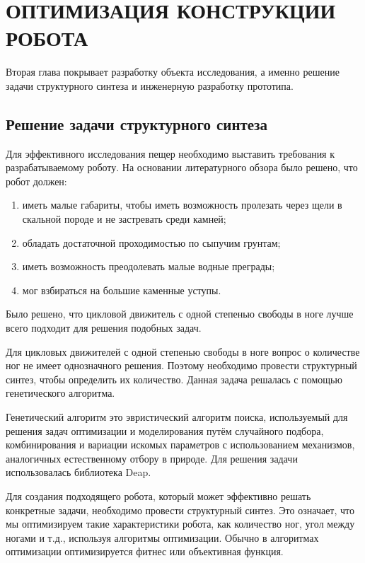 
\chapter{ОПТИМИЗАЦИЯ КОНСТРУКЦИИ РОБОТА}\label{ch:ch2}

Вторая глава покрывает разработку объекта исследования, а именно решение задачи структурного синтеза и инженерную разработку прототипа.

\section{Решение задачи структурного синтеза}

Для эффективного исследования пещер необходимо выставить требования к разрабатываемому роботу. На основании литературного обзора было решено, что робот должен:
\begin{enumerate}
    \item иметь малые габариты, чтобы иметь возможность пролезать через щели в скальной породе и не застревать среди камней;
    \item обладать достаточной проходимостью по сыпучим грунтам;
    \item иметь возможность преодолевать малые водные преграды;
    \item мог взбираться на большие каменные уступы.
\end{enumerate}

Было решено, что цикловой движитель с одной степенью свободы в ноге лучше всего подходит для решения подобных задач.

Для цикловых движителей с одной степенью свободы в ноге вопрос о количестве ног не имеет однозначного решения. Поэтому необходимо провести структурный синтез, чтобы определить их количество. Данная задача решалась с помощью генетического алгоритма.

Генетический алгоритм это эвристический алгоритм поиска, используемый для решения задач оптимизации и моделирования путём случайного подбора, комбинирования и вариации искомых параметров с использованием механизмов, аналогичных естественному отбору в природе. Для решения задачи использовалась библиотека Deap.

Для создания подходящего робота, который может эффективно решать конкретные задачи, необходимо провести структурный синтез. Это означает, что мы оптимизируем такие характеристики робота, как количество ног, угол между ногами и т.д., используя алгоритмы оптимизации. Обычно в алгоритмах оптимизации оптимизируется фитнес или объективная функция. 

